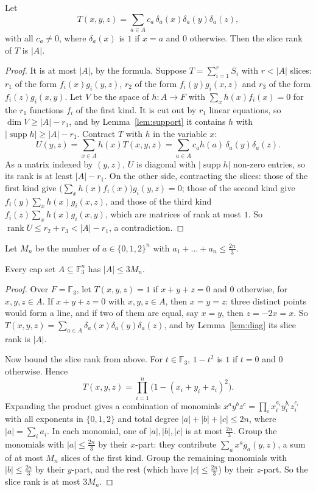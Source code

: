 \begin{lemma}[Tao, 2016]\label{lem:diag}
Let
\[
T(x,y,z)=\sum_{a\in A}c_a\,\delta_a(x)\delta_a(y)\delta_a(z),
\]
with all $c_a\ne0$, where $\delta_a(x)$ is $1$ if $x=a$ and $0$ otherwise. Then the slice rank of $T$ is $|A|$.
\end{lemma}
\begin{proof}
It is at most $|A|$, by the formula. Suppose $T=\sum_{i=1}^rS_i$ with $r<|A|$ slices: $r_1$ of the form $f_i(x)g_i(y,z)$, $r_2$ of the form $f_i(y)g_i(x,z)$ and $r_3$ of the form $f_i(z)g_i(x,y)$. Let $V$ be the space of
$h:A\to F$ with $\sum_xh(x)f_i(x)=0$ for the $r_1$ functions $f_i$ of the first kind. It is cut out by $r_1$ linear equations, so $\dim V\ge|A|-r_1$, and by Lemma~\ref{lem:support} it contains $h$ with
$|\operatorname{supp}h|\ge|A|-r_1$. Contract $T$ with $h$ in the variable $x$:
\[
U(y,z)=\sum_{x\in A}h(x)T(x,y,z)=\sum_{a\in A}c_ah(a)\,\delta_a(y)\delta_a(z).
\]
As a matrix indexed by $(y,z)$, $U$ is diagonal with $|\operatorname{supp}h|$ non-zero entries, so its rank is at least $|A|-r_1$. On the other side, contracting the slices: those of the first kind give
$\bigl(\sum_xh(x)f_i(x)\bigr)g_i(y,z)=0$; those of the second kind give $f_i(y)\sum_xh(x)g_i(x,z)$, and those of the third kind $f_i(z)\sum_xh(x)g_i(x,y)$, which are matrices of rank at most $1$. So
$\operatorname{rank}U\le r_2+r_3<|A|-r_1$, a contradiction.
\end{proof}

Let $M_n$ be the number of $a\in\{0,1,2\}^n$ with $a_1+\dots+a_n\le\frac{2n}3$.

\begin{theorem}\label{thm:capset}
Every cap set $A\subseteq\mathbb F_3^n$ has $|A|\le3M_n$.
\end{theorem}
\begin{proof}
Over $F=\mathbb F_3$, let $T(x,y,z)=1$ if $x+y+z=0$ and $0$ otherwise, for $x,y,z\in A$. If $x+y+z=0$ with $x,y,z\in A$, then $x=y=z$: three distinct points would form a line, and if two of them are equal,
say $x=y$, then $z=-2x=x$. So $T(x,y,z)=\sum_{a\in A}\delta_a(x)\delta_a(y)\delta_a(z)$, and by Lemma~\ref{lem:diag} its slice rank is $|A|$.

Now bound the slice rank from above. For $t\in\mathbb F_3$, $1-t^2$ is $1$ if $t=0$ and $0$ otherwise. Hence
\[
T(x,y,z)=\prod_{i=1}^n\bigl(1-(x_i+y_i+z_i)^2\bigr).
\]
Expanding the product gives a combination of monomials $x^ay^bz^c=\prod_ix_i^{a_i}y_i^{b_i}z_i^{c_i}$ with all exponents in $\{0,1,2\}$ and total degree $|a|+|b|+|c|\le2n$, where $|a|=\sum_ia_i$. In each
monomial, one of $|a|,|b|,|c|$ is at most $\frac{2n}3$. Group the monomials with $|a|\le\frac{2n}3$ by their $x$-part: they contribute $\sum_ax^ag_a(y,z)$, a sum of at most $M_n$ slices of the first kind. Group the
remaining monomials with $|b|\le\frac{2n}3$ by their $y$-part, and the rest (which have $|c|\le\frac{2n}3$) by their $z$-part. So the slice rank is at most $3M_n$.
\end{proof}

